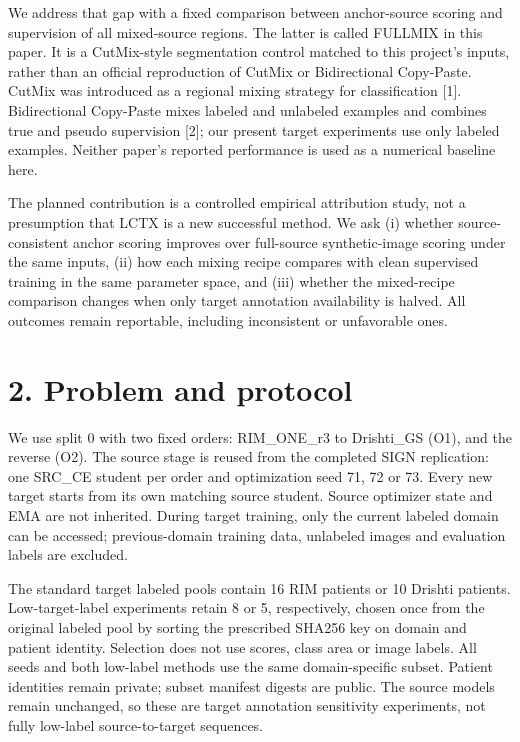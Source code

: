 \documentclass[
]{article}
\begin{document}
We address that gap with a fixed comparison between anchor-source
scoring and supervision of all mixed-source regions. The latter is
called FULLMIX in this paper. It is a CutMix-style segmentation control
matched to this project's inputs, rather than an official reproduction
of CutMix or Bidirectional Copy-Paste. CutMix was introduced as a
regional mixing strategy for classification {[}1{]}. Bidirectional
Copy-Paste mixes labeled and unlabeled examples and combines true and
pseudo supervision {[}2{]}; our present target experiments use only
labeled examples. Neither paper's reported performance is used as a
numerical baseline here.

The planned contribution is a controlled empirical attribution study,
not a presumption that LCTX is a new successful method. We ask (i)
whether source-consistent anchor scoring improves over full-source
synthetic-image scoring under the same inputs, (ii) how each mixing
recipe compares with clean supervised training in the same parameter
space, and (iii) whether the mixed-recipe comparison changes when only
target annotation availability is halved. All outcomes remain
reportable, including inconsistent or unfavorable ones.

\section{2. Problem and protocol}\label{problem-and-protocol}

We use split 0 with two fixed orders: RIM\_ONE\_r3 to Drishti\_GS (O1),
and the reverse (O2). The source stage is reused from the completed SIGN
replication: one SRC\_CE student per order and optimization seed 71, 72
or 73. Every new target starts from its own matching source student.
Source optimizer state and EMA are not inherited. During target
training, only the current labeled domain can be accessed;
previous-domain training data, unlabeled images and evaluation labels
are excluded.

The standard target labeled pools contain 16 RIM patients or 10 Drishti
patients. Low-target-label experiments retain 8 or 5, respectively,
chosen once from the original labeled pool by sorting the prescribed
SHA256 key on domain and patient identity. Selection does not use
scores, class area or image labels. All seeds and both low-label methods
use the same domain-specific subset. Patient identities remain private;
subset manifest digests are public. The source models remain unchanged,
so these are target annotation sensitivity experiments, not fully
low-label source-to-target sequences.
\end{document}
